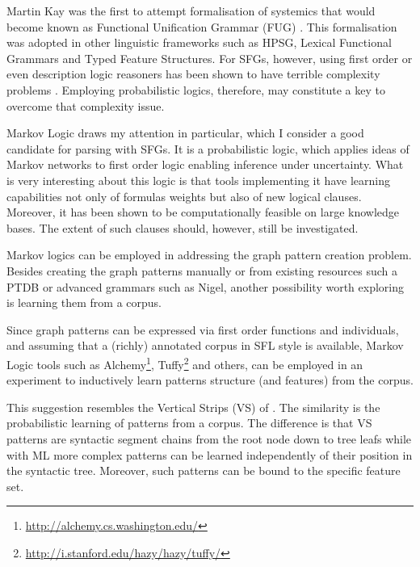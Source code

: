     Martin Kay was the first to attempt formalisation of systemics that would become known as Functional Unification Grammar (FUG) \citep{Kay1985}. This formalisation was adopted in other linguistic frameworks such as HPSG, Lexical Functional Grammars and Typed Feature Structures. For SFGs, however, using first order or even description logic reasoners has been shown to have terrible complexity problems \citep{Bateman2008}. Employing probabilistic logics, therefore, may constitute a key to overcome that complexity issue.
    
    Markov Logic \citep{Richardson2006,Domingos2010} draws my attention in particular, which I consider a good candidate for parsing with SFGs. It is a probabilistic logic, which applies ideas of Markov networks to first order logic enabling inference under uncertainty. What is very interesting about this logic is that tools implementing it have learning capabilities not only of formulas weights but also of new logical clauses. Moreover, it has been shown to be computationally feasible on large knowledge bases. The extent of such clauses should, however, still be investigated. 
    
    Markov logics can be employed in addressing the graph pattern creation problem. Besides creating the graph patterns manually or from existing resources such a PTDB or advanced grammars such as Nigel, another possibility worth exploring is learning them from a corpus. 
    
    
    Since graph patterns can be expressed via first order functions and individuals, and assuming that a (richly) annotated corpus in SFL style is available, Markov Logic tools such as Alchemy\footnote{\url{http://alchemy.cs.washington.edu/}}, Tuffy\footnote{\url{http://i.stanford.edu/hazy/hazy/tuffy/}} and others, can be employed in an experiment to inductively learn patterns structure (and features) from the corpus. 

    This suggestion resembles the Vertical Strips (VS) of \citet{ODonoghue1991a}. The similarity is the probabilistic learning of patterns from a corpus. The difference is that VS patterns are syntactic segment chains from the root node down to tree leafs while with ML more complex patterns can be learned independently of their position in the syntactic tree. Moreover, such patterns can be bound to the specific feature set. 
    
